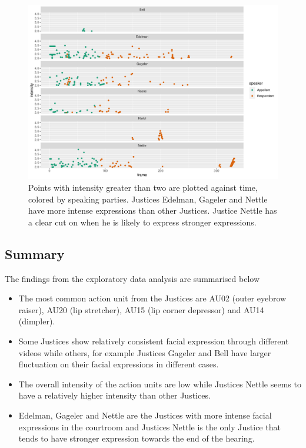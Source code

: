 \documentclass{monashthesis}
\begin{document}
\begin{figure}

{\centering \includegraphics[width=1\linewidth]{figures/high-intensity-points-1} 

}

\caption{Points with intensity greater than two are plotted against time, colored by speaking parties. Justices Edelman, Gageler and Nettle have more intense expressions than other Justices. Justice Nettle has a clear cut on when he is likely to express stronger expressions. }\label{fig:high-intensity-points}
\end{figure}

\newpage

\hypertarget{summary}{%
\subsection{Summary}\label{summary}}

The findings from the exploratory data analysis are summarised below

\begin{itemize}
\item
  The most common action unit from the Justices are AU02 (outer eyebrow raiser), AU20 (lip stretcher), AU15 (lip corner depressor) and AU14 (dimpler).
\item
  Some Justices show relatively consistent facial expression through different videos while others, for example Justices Gageler and Bell have larger fluctuation on their facial expressions in different cases.
\item
  The overall intensity of the action units are low while Justices Nettle seems to have a relatively higher intensity than other Justices.
\item
  Edelman, Gageler and Nettle are the Justices with more intense facial expressions in the courtroom and Justices Nettle is the only Justice that tends to have stronger expression towards the end of the hearing.
\end{itemize}
\end{document}
